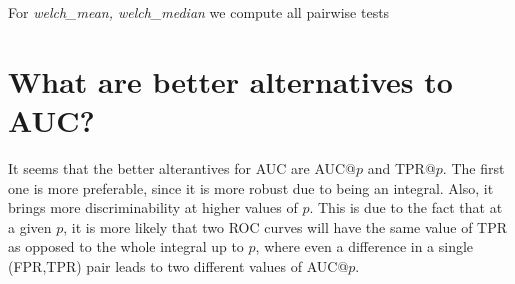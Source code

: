 \documentclass[a4paper]{article}
\begin{document}
For \emph{welch_mean, welch_median} we compute all pairwise tests







\section{What are better alternatives to AUC?}
It seems that the better alterantives for AUC are AUC@$p$ and TPR@$p$. The first one is more preferable, since it is more robust due to being an integral. Also, it brings more discriminability at higher values of $p$. This is due to the fact that at a given $p$, it is more likely that two ROC curves will have the same value of TPR as opposed to the whole integral up to $p$, where even a difference in a single (FPR,TPR) pair leads to two different values of AUC@$p$.



\end{document}
